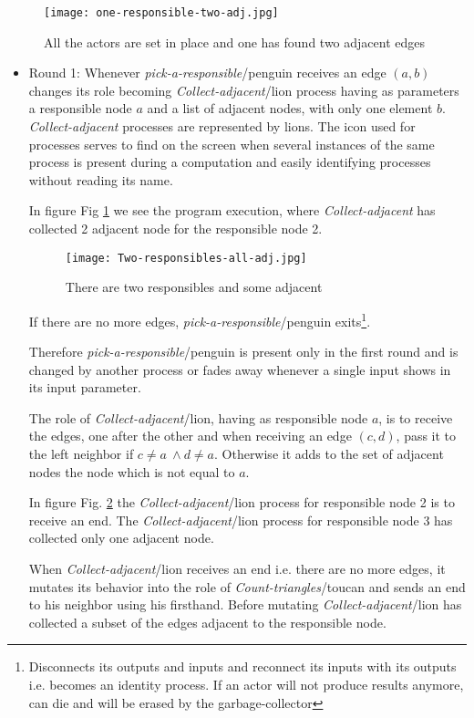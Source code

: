 \documentclass{article}                     \usepackage{graphics}
\begin{document}
\begin{figure}[h]
	\centering
	\texttt{[image: one-responsible-two-adj.jpg]}
	\caption{All the actors are set in place and  one has found two adjacent edges}
	\label{stage0.1}
\end{figure}
\begin{itemize}
\item Round 1:  Whenever \textit{pick-a-responsible}/penguin receives an edge   $(a,b)$ changes its role becoming  \textit{Collect-adjacent}/lion process having as parameters a  responsible node  $a$ and a list of adjacent nodes, with only one element $b$.  \textit{Collect-adjacent} processes are represented by lions. The icon used for processes serves to find on the screen when several instances of the same process is present during a computation and easily identifying processes without reading its name.


In figure Fig \ref{stage0.1} we see the program execution, where  \textit{Collect-adjacent} has collected 2 adjacent node for the responsible node 2.

\begin{figure}[h]
	\centering
	\texttt{[image: Two-responsibles-all-adj.jpg]}
	\caption{There are two responsibles and some adjacent}
	\label{stage1}
\end{figure}
If there are no more edges, \textit{pick-a-responsible}/penguin exits\footnote{Disconnects its outputs and inputs and reconnect its inputs with its outputs i.e. becomes an identity process. If an actor will not produce results anymore, can die and will be erased by the garbage-collector}.



Therefore  \textit{pick-a-responsible}/penguin is present only in the first round and is changed by another process or fades away whenever a single input shows in its input parameter.

The role of  \textit{Collect-adjacent}/lion, having as responsible node $a$,   is to receive the edges, one after the other and when receiving an edge $(c,d)$, pass it to the left neighbor if  $ c \neq a\ \wedge d \neq a$. Otherwise it adds to the set of adjacent nodes the node which is not equal to $a$.

In figure Fig. \ref{stage1}   the \textit{Collect-adjacent}/lion process  for responsible node 2 is to receive an end. The \textit{Collect-adjacent}/lion process  for responsible node 3 has collected only one adjacent node.

When  \textit{Collect-adjacent}/lion  receives an end i.e. there are no more edges, it mutates its behavior into the role of \textit{Count-triangles}/toucan and sends an end to his neighbor  using his firsthand. Before mutating  \textit{Collect-adjacent}/lion  has collected a subset of the edges adjacent to the responsible node.




\end{itemize}
\end{document}
